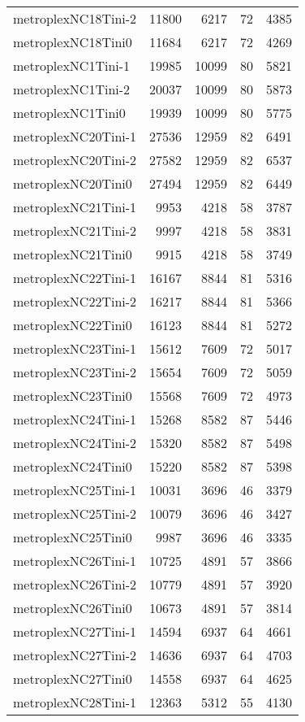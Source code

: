 \begin{longtable}{lrrrr}
metroplexNC18Tini-2 & 11800 & 6217 & 72 & 4385 \\
metroplexNC18Tini0 & 11684 & 6217 & 72 & 4269 \\
metroplexNC1Tini-1 & 19985 & 10099 & 80 & 5821 \\
metroplexNC1Tini-2 & 20037 & 10099 & 80 & 5873 \\
metroplexNC1Tini0 & 19939 & 10099 & 80 & 5775 \\
metroplexNC20Tini-1 & 27536 & 12959 & 82 & 6491 \\
metroplexNC20Tini-2 & 27582 & 12959 & 82 & 6537 \\
metroplexNC20Tini0 & 27494 & 12959 & 82 & 6449 \\
metroplexNC21Tini-1 & 9953 & 4218 & 58 & 3787 \\
metroplexNC21Tini-2 & 9997 & 4218 & 58 & 3831 \\
metroplexNC21Tini0 & 9915 & 4218 & 58 & 3749 \\
metroplexNC22Tini-1 & 16167 & 8844 & 81 & 5316 \\
metroplexNC22Tini-2 & 16217 & 8844 & 81 & 5366 \\
metroplexNC22Tini0 & 16123 & 8844 & 81 & 5272 \\
metroplexNC23Tini-1 & 15612 & 7609 & 72 & 5017 \\
metroplexNC23Tini-2 & 15654 & 7609 & 72 & 5059 \\
metroplexNC23Tini0 & 15568 & 7609 & 72 & 4973 \\
metroplexNC24Tini-1 & 15268 & 8582 & 87 & 5446 \\
metroplexNC24Tini-2 & 15320 & 8582 & 87 & 5498 \\
metroplexNC24Tini0 & 15220 & 8582 & 87 & 5398 \\
metroplexNC25Tini-1 & 10031 & 3696 & 46 & 3379 \\
metroplexNC25Tini-2 & 10079 & 3696 & 46 & 3427 \\
metroplexNC25Tini0 & 9987 & 3696 & 46 & 3335 \\
metroplexNC26Tini-1 & 10725 & 4891 & 57 & 3866 \\
metroplexNC26Tini-2 & 10779 & 4891 & 57 & 3920 \\
metroplexNC26Tini0 & 10673 & 4891 & 57 & 3814 \\
metroplexNC27Tini-1 & 14594 & 6937 & 64 & 4661 \\
metroplexNC27Tini-2 & 14636 & 6937 & 64 & 4703 \\
metroplexNC27Tini0 & 14558 & 6937 & 64 & 4625 \\
metroplexNC28Tini-1 & 12363 & 5312 & 55 & 4130 \\

\end{longtable}
